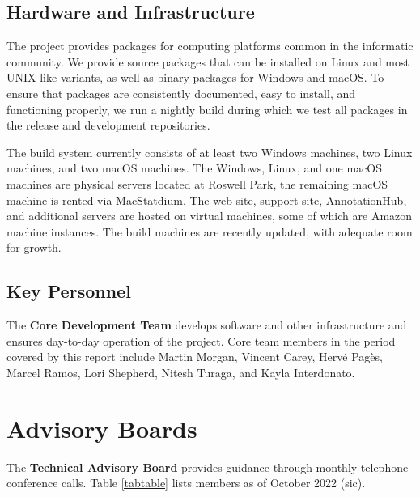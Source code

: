 \documentclass[letterpaper]{article}
\begin{document}
\subsection{Hardware and Infrastructure}
\label{sec:pkg_building}

The \Bioconductor{} project provides packages for computing platforms
common in the informatic community.  We provide source packages
that can be installed on Linux and most UNIX-like variants, as well as
binary packages for Windows and macOS.  To ensure that packages are
consistently documented, easy to install, and functioning properly, we
run a nightly build during which we test all packages in the release
and development repositories.  

The build system currently consists of at least two Windows machines,
two Linux machines, and two macOS machines. The Windows, Linux, and
one macOS machines are physical servers located at Roswell Park, the
remaining macOS machine is rented via MacStatdium. The web site,
support site, AnnotationHub, and additional servers are hosted on
virtual machines, some of which are Amazon machine instances. The
build machines are recently updated, with adequate room for growth.

\subsection{Key Personnel}
\label{sec:key_personnel}

The \textbf{Core Development Team} 
develops software and other infrastructure
and ensures day-to-day operation of the project. Core team members in
the period covered by this report include Martin Morgan, Vincent Carey, Herv\'{e}
Pag\`{e}s, Marcel Ramos, Lori Shepherd, Nitesh Turaga,
and Kayla Interdonato. 

\section{Advisory Boards}

The \textbf{Technical Advisory Board} provides guidance through
monthly telephone conference calls.  Table \ref{tabtable}
lists members as of October 2022 (sic).
\end{document}
